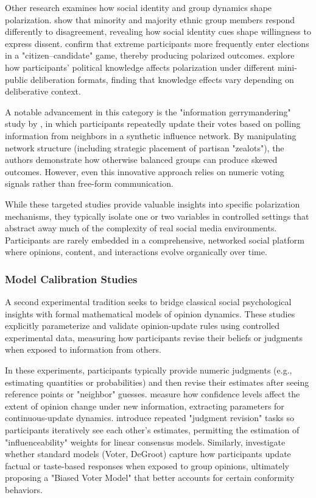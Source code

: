 Other research examines how social identity and group dynamics shape polarization. \citep{wuestenenk_influence_2023} show that minority and majority ethnic group members respond differently to disagreement, revealing how social identity cues shape willingness to express dissent. \citep{groser_candidate_2019} confirm that extreme participants more frequently enter elections in a "citizen–candidate" game, thereby producing polarized outcomes. \citep{herne_influence_2019} explore how participants' political knowledge affects polarization under different mini-public deliberation formats, finding that knowledge effects vary depending on deliberative context.

A notable advancement in this category is the "information gerrymandering" study by \citep{stewart_information_2019}, in which participants repeatedly update their votes based on polling information from neighbors in a synthetic influence network. By manipulating network structure (including strategic placement of partisan "zealots"), the authors demonstrate how otherwise balanced groups can produce skewed outcomes. However, even this innovative approach relies on numeric voting signals rather than free-form communication.

While these targeted studies provide valuable insights into specific polarization mechanisms, they typically isolate one or two variables in controlled settings that abstract away much of the complexity of real social media environments. Participants are rarely embedded in a comprehensive, networked social platform where opinions, content, and interactions evolve organically over time.

\subsubsection{Model Calibration Studies}
A second experimental tradition seeks to bridge classical social psychological insights with formal mathematical models of opinion dynamics. These studies explicitly parameterize and validate opinion-update rules using controlled experimental data, measuring how participants revise their beliefs or judgments when exposed to information from others.

In these experiments, participants typically provide numeric judgments (e.g., estimating quantities or probabilities) and then revise their estimates after seeing reference points or "neighbor" guesses. \citep{chacoma_opinion_2015} measure how confidence levels affect the extent of opinion change under new information, extracting parameters for continuous-update dynamics. \citep{vande_kerckhove_modelling_2016} introduce repeated "judgment revision" tasks so participants iteratively see each other's estimates, permitting the estimation of "influenceability" weights for linear consensus models. Similarly, \citep{das_modeling_2014} investigate whether standard models (Voter, DeGroot) capture how participants update factual or taste-based responses when exposed to group opinions, ultimately proposing a "Biased Voter Model" that better accounts for certain conformity behaviors.

